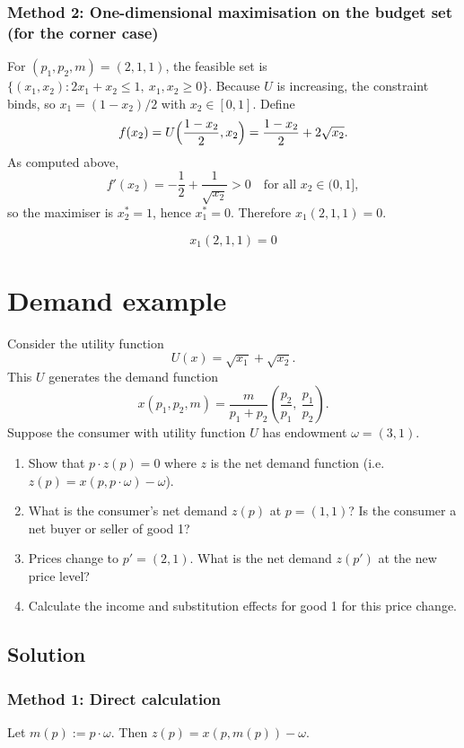 \documentclass[12pt]{article}
\newcommand{\dotp}{\cdot}
\begin{document}
\subsubsection*{Method 2: One-dimensional maximisation on the budget set (for the corner case)}
For \((p_1,p_2,m)=(2,1,1)\), the feasible set is \(\{(x_1,x_2): 2x_1+x_2\le 1,\ x_1,x_2\ge 0\}\).
Because \(U\) is increasing, the constraint binds, so \(x_1=(1-x_2)/2\) with \(x_2\in[0,1]\).
Define
\[
f(x_2)=U\Bigl(\frac{1-x_2}{2},x_2\Bigr)=\frac{1-x_2}{2}+2\sqrt{x_2}.
\]
As computed above,
\[
f'(x_2)=-\frac12+\frac{1}{\sqrt{x_2}}>0\quad \text{for all }x_2\in(0,1],
\]
so the maximiser is \(x_2^*=1\), hence \(x_1^*=0\). Therefore \(x_1(2,1,1)=0\).

\[
\boxed{\,x_1(2,1,1)=0\,}
\]

\newpage
\section{Demand example}
Consider the utility function
\[
U(x)=\sqrt{x_1}+\sqrt{x_2}.
\]
This \(U\) generates the demand function
\[
x(p_1,p_2,m)=\frac{m}{p_1+p_2}\left(\frac{p_2}{p_1},\ \frac{p_1}{p_2}\right).
\]
Suppose the consumer with utility function \(U\) has endowment \(\omega=(3,1)\).
\begin{enumerate}[label=\arabic*., leftmargin=*]
  \item Show that \(p\dotp z(p)=0\) where \(z\) is the net demand function (i.e.\ \(z(p)=x(p,p\dotp \omega)-\omega\)).
  \item What is the consumer's net demand \(z(p)\) at \(p=(1,1)\)? Is the consumer a net buyer or seller of good 1?
  \item Prices change to \(p'=(2,1)\). What is the net demand \(z(p')\) at the new price level?
  \item Calculate the income and substitution effects for good 1 for this price change.
\end{enumerate}

\subsection*{Solution}
\subsubsection*{Method 1: Direct calculation}
Let \(m(p):=p\dotp \omega\). Then \(z(p)=x(p,m(p))-\omega\).
\end{document}
